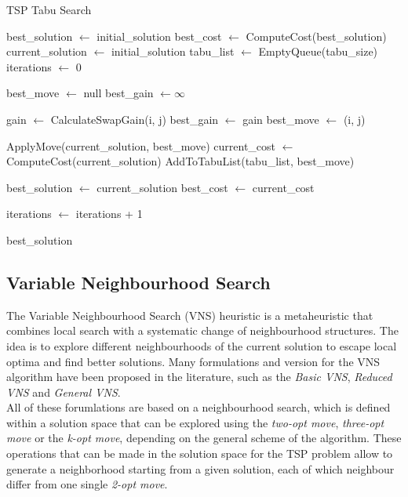 \documentclass{article}
\begin{document}
\begin{algorithm}[!ht]
\caption{TSP Tabu Search}
\begin{algorithmic}[1]
\State best\_solution $\gets$ initial\_solution
\State best\_cost $\gets$ ComputeCost(best\_solution)
\State current\_solution $\gets$ initial\_solution
\State tabu\_list $\gets$ EmptyQueue(tabu\_size)
\State iterations $\gets$ 0

    \State best\_move $\gets$ null
    \State best\_gain $\gets \infty$
    
            \State gain $\gets$ CalculateSwapGain(i, j)
                \State best\_gain $\gets$ gain
                \State best\_move $\gets$ (i, j)
            \EndIf
        \EndIf
    \EndFor
    
    \State ApplyMove(current\_solution, best\_move)
    \State current\_cost $\gets$ ComputeCost(current\_solution)
    \State AddToTabuList(tabu\_list, best\_move)
    
        \State best\_solution $\gets$ current\_solution
        \State best\_cost $\gets$ current\_cost
    \EndIf
    
    \State iterations $\gets$ iterations + 1
\EndWhile

\State \Return best\_solution
\EndProcedure
\end{algorithmic}
\end{algorithm}

\newpage

\subsection{Variable Neighbourhood Search}
The Variable Neighbourhood Search (VNS) heuristic is a metaheuristic that combines local search with a systematic change of neighbourhood structures. 
The idea is to explore different neighbourhoods of the current solution to escape local optima and find better solutions.
Many formulations and version for the VNS algorithm have been proposed in the literature, such as the \textit{Basic VNS}, \textit{Reduced VNS} and \textit{General VNS}.\cite{VariableNeighborhood_Search}\\

All of these forumlations are based on a neighbourhood search, which is defined within a solution space that can be explored using the \textit{two-opt move}, 
\textit{three-opt move} or the \textit{k-opt move}, depending on the general scheme of the algorithm. These operations that can be made in the solution space for the TSP problem allow to generate a neighborhood
starting from a given solution, each of which neighbour differ from one single \textit{2-opt move}\cite{Heuristics_for_the_Traveling_Salesman_Problem}. 
\end{document}
